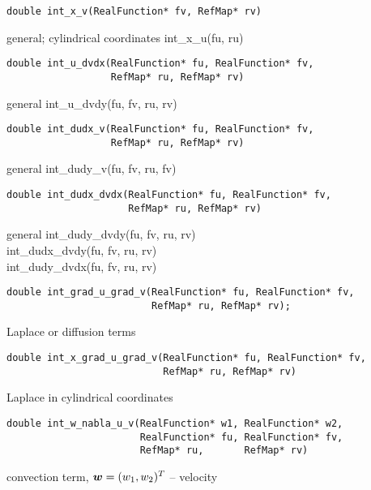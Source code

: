 \begin{lstlisting}
double int_x_v(RealFunction* fv, RefMap* rv)
\end{lstlisting}
      {general; cylindrical coordinates}
      {\var int\_x\_u(fu, ru)}



\begin{lstlisting}
double int_u_dvdx(RealFunction* fu, RealFunction* fv,
                  RefMap* ru, RefMap* rv)
\end{lstlisting}
      {general}
      {\var int\_u\_dvdy(fu, fv, ru, rv)}



\begin{lstlisting}
double int_dudx_v(RealFunction* fu, RealFunction* fv,
                  RefMap* ru, RefMap* rv)
\end{lstlisting}
      {general}
      {\var int\_dudy\_v(fu, fv, ru, fv)}



\begin{lstlisting}
double int_dudx_dvdx(RealFunction* fu, RealFunction* fv,
                     RefMap* ru, RefMap* rv)
\end{lstlisting}
      {general}
      {     \var int\_dudy\_dvdy(fu, fv, ru, rv) \\
       \>\> \var int\_dudx\_dvdy(fu, fv, ru, rv) \\
       \>\> \var int\_dudy\_dvdx(fu, fv, ru, rv) }


\begin{lstlisting}
double int_grad_u_grad_v(RealFunction* fu, RealFunction* fv,
                         RefMap* ru, RefMap* rv);
\end{lstlisting}
     {Laplace or diffusion terms}




\begin{lstlisting}
double int_x_grad_u_grad_v(RealFunction* fu, RealFunction* fv,
                           RefMap* ru, RefMap* rv)
\end{lstlisting}
     {Laplace in cylindrical coordinates}



\begin{lstlisting}
double int_w_nabla_u_v(RealFunction* w1, RealFunction* w2,
                       RealFunction* fu, RealFunction* fv,
                       RefMap* ru,       RefMap* rv)
\end{lstlisting}
     {convection term, $\mbox{\boldmath $w$} = (w_1, w_2)^T$ -- velocity}



